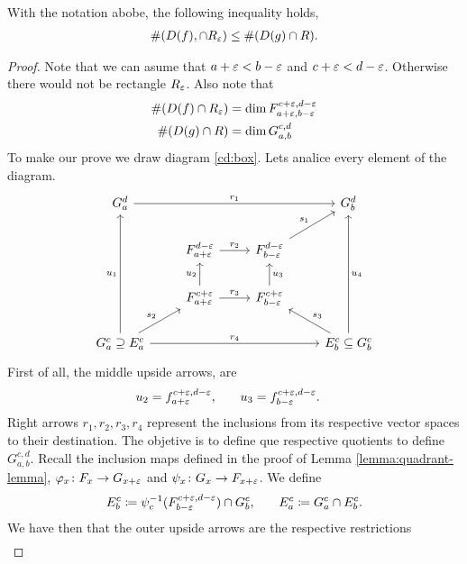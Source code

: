 \begin{lemma} \label{lemma:box-lemma}
    With the notation abobe, the following inequality holds,
    \begin{align}
        \#(D(f), \cap R_\varepsilon) \leq \#(D(g) \cap R).
    \end{align}
\end{lemma}
\begin{proof}
Note that we can asume that $ a + \varepsilon < b - \varepsilon $ and $ c+\varepsilon < d - \varepsilon $. Otherwise there would not be rectangle $ R_\varepsilon $. Also note that
\begin{align}
    \#(D(f) \cap R_\varepsilon) &= \dim F_{a+\varepsilon, b-\varepsilon}^{c+\varepsilon, d-\varepsilon} \\
    \#(D(g) \cap R) &= \dim G_{a, b}^{c, d} \\
\end{align}
To make our prove we draw diagram \ref{cd:box}. Lets analice every element of the diagram.
\begin{equation} \label{cd:box}
\begin{tikzcd}
    G_a^d \arrow[rrr, "r_1"]
    & & & G_b^d \\
    & F_{a+\e}^{d-\e} \arrow[r, "r_2"]
    & F_{b-\e}^{d-\e} \arrow[ru, "s_1"] & \\
    & F_{a+\e}^{c+\e} \arrow[u, "u_2"] \arrow[r, "r_3"]
    & F_{b-\e}^{c+\e} \arrow[u, "u_3"'] & \\
    G_a^c \supseteq E_a^c \arrow[ru, "s_2"] \arrow[uuu, "u_1"] \arrow[rrr, "r_4"]
    & & & E_b^c \subseteq G_b^c \arrow[lu, "s_3"'] \arrow[uuu, "u_4"']
\end{tikzcd}
\end{equation}
First of all, the middle upside arrows, are
\begin{align}
    u_2 &= f_{a+\varepsilon}^{c+\varepsilon, d-\varepsilon}, \quad & u_3 &= f_{b-\varepsilon}^{c+\varepsilon, d-\varepsilon}.
\end{align}
Right arrows $ r_1, r_2, r_3, r_4 $ represent the inclusions from its respective vector spaces to their destination. The objetive is to define que respective quotients to define $ G_{a, b}^{c, d} $. Recall the inclusion maps defined in the proof of Lemma \ref{lemma:quadrant-lemma}, $ \varphi_x \colon F_x \to G_{x+\varepsilon} $ and $ \psi_x \colon G_x \to F_{x+\varepsilon}$. We define
\begin{align}
    E_b^c &\coloneq \psi_c^{-1}(F_{b-\varepsilon}^{c+\varepsilon, d-\varepsilon}) \cap G_b^c, \quad & E_a^c \coloneq G_a^c \cap E_b^c.
\end{align}
We have then that the outer upside arrows are the respective restrictions
\begin{align}

\end{align}
\end{proof}
